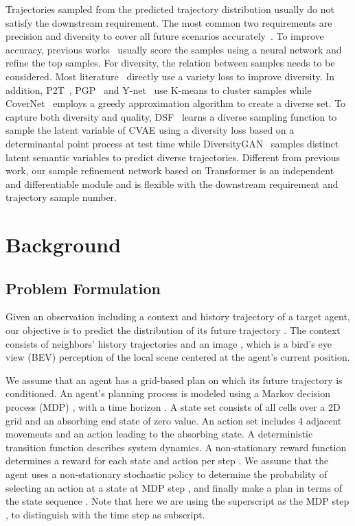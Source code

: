 \documentclass[10pt,twocolumn,letterpaper]{article}
\begin{document}
Trajectories sampled from the predicted trajectory distribution usually do not satisfy the downstream requirement. The most common two requirements are precision and diversity to cover all future scenarios accurately~\cite{rhinehart2018r2p2,park2020diverse}. To improve accuracy, previous works~\cite{lee2017desire,zhao2020tnt,marchetti2020mantra} usually score the samples using a neural network and refine the top samples. For diversity, the relation between samples needs to be considered. Most literature~\cite{gupta2018social,huang2019stgat,dendorfer2020goal} directly use a variety loss to improve diversity. In addition, P2T~\cite{deo2020trajectory}, PGP~\cite{deo2021multimodal} and Y-net~\cite{mangalam2021goals} use K-means to cluster samples while CoverNet~\cite{phan2020covernet} employs a greedy approximation algorithm to create a diverse set. To capture both diversity and quality, DSF~\cite{yuan2020diverse} learns a diverse sampling function to sample the latent variable of CVAE using a diversity loss based on a determinantal point process at test time while DiversityGAN~\cite{huang2020diversitygan} samples distinct latent semantic variables to predict diverse trajectories. Different from previous work, our sample refinement network based on Transformer is an independent and differentiable module and is flexible with the downstream requirement and trajectory sample number.

\section{Background}
\label{sec:background}
\subsection{Problem Formulation}

Given an observation  including a context and history trajectory  of a target agent, our objective is to predict the distribution  of its future trajectory . The context consists of neighbors' history trajectories and an image , which is a bird's eye view (BEV) perception of the local scene centered at the agent's current position.

We assume that an agent has a grid-based plan on which its future trajectory is conditioned. An agent's planning process is modeled using a Markov decision process (MDP) , with a time horizon . A state set  consists of all cells over a 2D grid and an absorbing end state of zero value. An action set  includes 4 adjacent movements  and an  action leading to the absorbing state. A deterministic transition function  describes system dynamics. A non-stationary reward function  determines a reward for each state and action per step . We assume that the agent uses a non-stationary stochastic policy  to determine the probability of selecting an action  at a state  at MDP step , and finally make a plan in terms of the state sequence . Note that here we are using the superscript  as the MDP step , to distinguish with the time step  as subscript.
\end{document}
